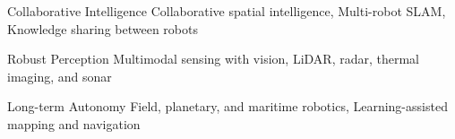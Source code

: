 

\begin{cvskills}

  \cvskill
    {Collaborative Intelligence} %
    {Collaborative spatial intelligence, Multi-robot SLAM, Knowledge sharing between robots} %

  \cvskill
    {Robust Perception} %
    {Multimodal sensing with vision, LiDAR, radar, thermal imaging, and sonar} %

  \cvskill
    {Long-term Autonomy} %
    {Field, planetary, and maritime robotics, Learning-assisted mapping and navigation} %

\end{cvskills}
